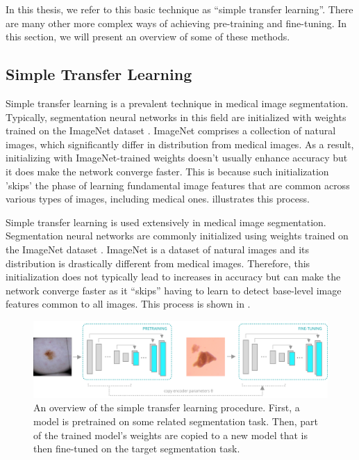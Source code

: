 In this thesis, we refer to this basic technique as ``simple transfer learning''. There are many other more complex ways of achieving pre-training and fine-tuning. In this section, we will present an overview of some of these methods.

	\subsection{Simple Transfer Learning}
	
	Simple transfer learning is a prevalent technique in medical image segmentation. Typically, segmentation neural networks in this field are initialized with weights trained on the ImageNet dataset \cite{dengImageNetLargescaleHierarchical2009a}. ImageNet comprises a collection of natural images, which significantly differ in distribution from medical images. As a result, initializing with ImageNet-trained weights doesn't usually enhance accuracy but it does make the network converge faster. This is because such initialization 'skips' the phase of learning fundamental image features that are common across various types of images, including medical ones.  illustrates this process.
	
Simple transfer learning is used extensively in medical image segmentation. Segmentation neural networks are commonly initialized using weights trained on the ImageNet dataset \cite{dengImageNetLargescaleHierarchical2009a}. ImageNet is a dataset of natural images and its distribution is drastically different from medical images. Therefore, this initialization does not typically lead to increases in accuracy but can make the network converge faster as it ``skips'' having to learn to detect base-level image features common to all images. This process is shown in .

\begin{figure}[h]
 \centering
 \includegraphics[width=\linewidth]{images/3/simple-transfer-learning-diagram}
 \caption{An overview of the simple transfer learning procedure. First, a model is pretrained on some related segmentation task. Then, part of the trained model's weights are copied to a new model that is then fine-tuned on the target segmentation task.}
 \label{fig:stl-diagram}
\end{figure}

